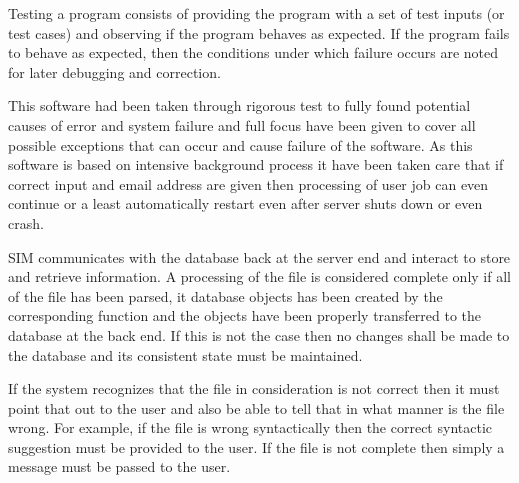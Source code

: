 Testing a program consists of providing the program with a set of test inputs (or test cases) and
observing if the program behaves as expected. If the program fails to behave as expected, then the
conditions under which failure occurs are noted for later debugging and correction. 


This software had been taken through rigorous test to fully found potential causes of error and system failure
and full focus have been given to cover all possible exceptions that can 
occur and cause failure of the software.
As this software is based on intensive background process it have been taken care that 
if correct input and email address are given then processing of user job can even continue or a least automatically 
restart even after server shuts down or even crash.

SIM communicates with the database back at the server end and interact to store and retrieve information. A processing of the file is considered complete only if all of the file has been parsed, it database objects has been created by the corresponding function and the objects have been properly transferred to the database at the back end. If this is not the case then no changes shall be made to the database and its consistent state must be maintained.

If the system recognizes that the file in consideration is not correct then it must point that out to the user and also be able to tell that in what manner is the file wrong. For example, if the file is wrong syntactically then the correct syntactic suggestion must be provided to the user.  If the file is not complete then simply a message must be passed to the user.

